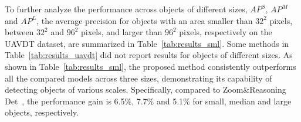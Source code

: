 \documentclass[letterpaper]{article} %
\begin{document}
To further analyze the performance across objects of different sizes, $AP^S$, $AP^M$ and $AP^L$, the average precision for objects with an area smaller than $32^2$ pixels, between $32^2$ and $96^2$ pixels, and larger than $96^2$ pixels, respectively on the UAVDT dataset, are summarized in Table~\ref{tab:results_sml}. %
Some methods in Table~\ref{tab:results_uavdt} did not %
report results for objects of different sizes. As shown in Table~\ref{tab:results_sml}, the proposed method consistently outperforms all the compared models across three sizes, demonstrating its capability of detecting objects of various scales. Specifically, compared %
to Zoom\&Reasoning Det~\cite{Ge_2022_ZoomAndReasoning},
the performance gain is 6.5\%, 7.7\% and 5.1\% for small, median and large objects, respectively. %
\begin{table}[!t]
 \centering
 \caption{Comparison with state-of-the-art methods on the UAVDT dataset in terms of $AP^S$, $AP^M$ and $AP^L$.}
 \label{tab:results_sml}
\end{table}
\end{document}
